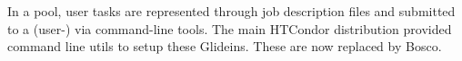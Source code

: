 \documentclass{sig-alternate}
\begin{document}
In a pool, user tasks are represented through job description files and
submitted to a (user-) via command-line tools. The main HTCondor
distribution provided command line utils to setup these Glideins. These are now
replaced by Bosco.

%


%

\end{document}
